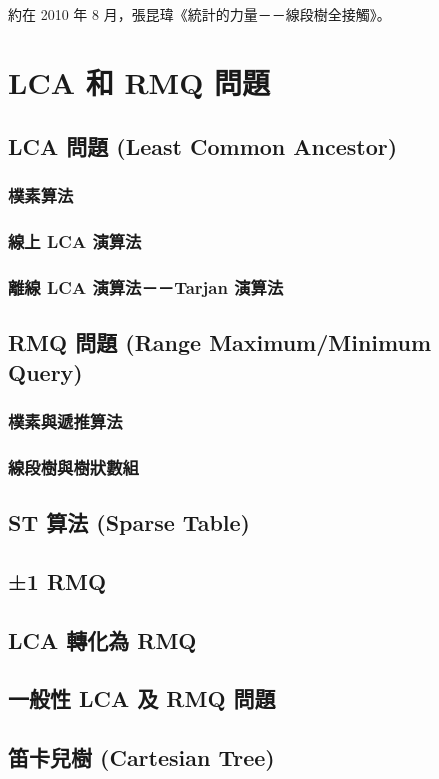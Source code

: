 \documentclass[12pt,a4paper,oneside]{report}
\begin{document}
\begin{CJK}{UTF8}{bkai}
\paragraph{}約在 2010 年 8 月，張昆瑋《統計的力量－－線段樹全接觸》。

\section{LCA 和 RMQ 問題}

\subsection{LCA 問題 (Least Common Ancestor)}

\subsubsection{樸素算法}

\subsubsection{線上 LCA 演算法}

\subsubsection{離線 LCA 演算法－－Tarjan 演算法}

\subsection{RMQ 問題 (Range Maximum/Minimum Query)}\label{tree:sec:rmq}

\subsubsection{樸素與遞推算法}
\subsubsection{線段樹與樹狀數組}

\subsection{ST 算法 (Sparse Table)}
\subsection{±1 RMQ}
\subsection{LCA 轉化為 RMQ}
\subsection{一般性 LCA 及 RMQ 問題}
\subsection{笛卡兒樹 (Cartesian Tree)}

\ifx \allfiles \undefined
\printindex[noun]

\clearpage
\end{CJK}
\end{document}
